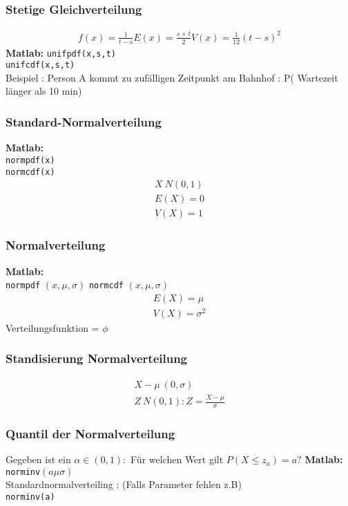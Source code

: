 \documentclass[landscape,twocolumn,a4paper]{article}
\begin{document}
\subsubsection{Stetige Gleichverteilung}
\begin{align}
 f(x) = \frac{1}{t-s}
 E(x) = \frac{s+t}{2}
 V(x) = \frac{1}{12} (t-s)^2
\end{align}
\textbf{Matlab:}
\texttt{unifpdf(x,s,t)}\\
\texttt{unifcdf(x,s,t)}\\
Beispiel : Person A kommt zu zufälligen Zeitpunkt am Bahnhof : P( Wartezeit länger als 10 min)

\subsubsection*{Standard-Normalverteilung}
\textbf{Matlab:}\\
\texttt{normpdf(x)}\\
\texttt{normcdf(x)}\\
\begin{align}
 X~N(0,1)\\
 E(X) = 0\\
 V(X) = 1
\end{align}

\subsubsection*{Normalverteilung}
\textbf{Matlab:}\\
\texttt{normpdf} $(x,\mu,\sigma)$
\texttt{normcdf} $(x,\mu,\sigma)$
\begin{align}
 E(X) = \mu\\
 V(X) = \sigma^2
\end{align}
Verteilungsfunktion = $\phi$
\subsubsection*{Standisierung Normalverteilung}
\begin{align}
 X - \mu ~ (0,\sigma)\\
 Z ~ N(0,1) : Z = \frac{X - \mu}{\sigma}
\end{align}

\subsubsection*{Quantil der Normalverteilung}
Gegeben ist ein $\alpha \in (0,1) : $ Für welchen Wert gilt $P(X \le z_a) = a?$
\textbf{Matlab:}\\
\texttt{norminv$(a\mu\sigma)$}\\
Standardnormalverteiling : (Falls Parameter fehlen z.B) \\
\texttt{norminv(a)}
\end{document}
